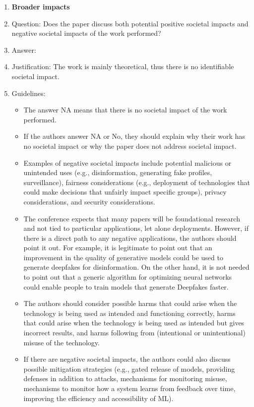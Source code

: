 \documentclass{article}
\theoremstyle{plain}
\theoremstyle{definition}
\theoremstyle{remark}
\begin{document}
\begin{enumerate}
\item {\bf Broader impacts}
    \item[] Question: Does the paper discuss both potential positive societal impacts and negative societal impacts of the work performed?
    \item[] Answer: \answerNA{} %
    \item[] Justification: The work is mainly theoretical, thus there is no identifiable societal impact.
    \item[] Guidelines:
    \begin{itemize}
        \item The answer NA means that there is no societal impact of the work performed.
        \item If the authors answer NA or No, they should explain why their work has no societal impact or why the paper does not address societal impact.
        \item Examples of negative societal impacts include potential malicious or unintended uses (e.g., disinformation, generating fake profiles, surveillance), fairness considerations (e.g., deployment of technologies that could make decisions that unfairly impact specific groups), privacy considerations, and security considerations.
        \item The conference expects that many papers will be foundational research and not tied to particular applications, let alone deployments. However, if there is a direct path to any negative applications, the authors should point it out. For example, it is legitimate to point out that an improvement in the quality of generative models could be used to generate deepfakes for disinformation. On the other hand, it is not needed to point out that a generic algorithm for optimizing neural networks could enable people to train models that generate Deepfakes faster.
        \item The authors should consider possible harms that could arise when the technology is being used as intended and functioning correctly, harms that could arise when the technology is being used as intended but gives incorrect results, and harms following from (intentional or unintentional) misuse of the technology.
        \item If there are negative societal impacts, the authors could also discuss possible mitigation strategies (e.g., gated release of models, providing defenses in addition to attacks, mechanisms for monitoring misuse, mechanisms to monitor how a system learns from feedback over time, improving the efficiency and accessibility of ML).
    \end{itemize}
    

\end{enumerate}
\end{document}
